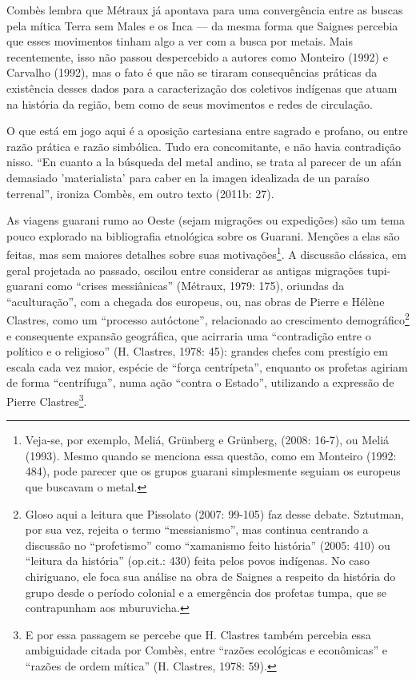 Combès lembra que Métraux já apontava para uma convergência entre as
buscas pela mítica Terra sem Males e os Inca — da mesma forma que
Saignes percebia que esses movimentos tinham algo a ver com a busca por
metais. Mais recentemente, isso não passou despercebido a autores como
Monteiro (1992) e Carvalho (1992), mas o fato é que não se tiraram
consequências práticas da existência desses dados para a caracterização
dos coletivos indígenas que atuam na história da região, bem como de
seus movimentos e redes de circulação.

O que está em jogo aqui é a oposição cartesiana entre sagrado e profano,
ou entre razão prática e razão simbólica. Tudo era concomitante, e não
havia contradição nisso. ``En cuanto a la búsqueda del metal andino, se
trata al parecer de un afán demasiado
'materialista' para caber en la
imagen idealizada de un paraíso terrenal'', ironiza Combès, em outro
texto (2011b: 27).

As viagens guarani rumo ao Oeste (sejam migrações ou expedições) são um
tema pouco explorado na bibliografia etnológica sobre os Guarani.
Menções a elas são feitas, mas sem maiores detalhes sobre suas
motivações\footnote{Veja-se, por exemplo, Meliá, Grünberg e Grünberg,
(2008: 16-7), ou Meliá (1993). Mesmo quando se menciona essa questão,
como em Monteiro (1992: 484), pode parecer que os grupos guarani
simplesmente seguiam os europeus que buscavam o metal. }. A discussão
clássica, em geral projetada ao passado, oscilou entre considerar as
antigas migrações tupi-guarani como ``crises messiânicas'' (Métraux,
1979: 175), oriundas da ``aculturação'', com a chegada dos europeus, ou,
nas obras de Pierre e Hélène Clastres, como um ``processo autóctone'',
relacionado ao crescimento demográfico\footnote{Gloso aqui a leitura
que Pissolato (2007: 99-105) faz desse debate. Sztutman, por sua vez,
rejeita o termo ``messianismo'', mas continua centrando a discussão no
``profetismo'' como ``xamanismo feito história'' (2005: 410) ou ``leitura da
história'' (op.cit.: 430) feita pelos povos indígenas. No caso
chiriguano, ele foca sua análise na obra de Saignes a respeito da
história do grupo desde o período colonial e a emergência dos profetas
tumpa, que se contrapunham aos mburuvicha.} e consequente expansão
geográfica, que acirraria uma ``contradição entre o político e o
religioso'' (H. Clastres, 1978: 45): grandes chefes com prestígio em
escala cada vez maior, espécie de ``força centrípeta'', enquanto os
profetas agiriam de forma ``centrífuga'', numa ação ``contra o Estado'',
utilizando a expressão de Pierre Clastres\footnote{E por essa passagem
se percebe que H. Clastres também percebia essa ambiguidade citada por
Combès, entre ``razões ecológicas e econômicas'' e ``razões de ordem
mítica'' (H. Clastres, 1978: 59).}.

